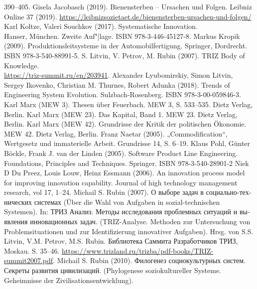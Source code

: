 \documentclass[11pt,a4paper]{article}
\begin{document}
\begin{thebibliography}{xxx}
  390–405.
 Gisela Jacobasch (2019). Bienensterben -- Ursachen und
  Folgen.  Leibniz Online 37 (2019).
  \url{https://leibnizsozietaet.de/bienensterben-ursachen-und-folgen/}
 Karl Koltze, Valeri Souchkov (2017).  Systematische
  Innovation.\\ Hanser, München. Zweite Auf"|lage. ISBN 978-3-446-45127-8.
 Markus Kropik (2009). Produktionsleitsysteme in der
    Automobilfertigung. Springer, Dordrecht.\\ ISBN 978-3-540-88991-5.
 S. Litvin, V. Petrov, M. Rubin (2007). TRIZ Body of
  Knowledge. \\ \url{https://triz-summit.ru/en/203941}.
 Alexander Lyubomirskiy, Simon Litvin, Sergey Ikovenko,
  Christian M. Thurnes, Robert Adunka (2018). Trends of Engineering System
  Evolution. Sulzbach-Rosenberg.  ISBN 978-3-00-059846-3.
 Karl Marx (MEW 3).  Thesen über Feuerbach. MEW 3, S. 533--535.
  Dietz Verlag, Berlin.
 Karl Marx (MEW 23). Das Kapital, Band 1. MEW 23. Dietz Verlag,
  Berlin.
 Karl Marx (MEW 42). Grundrisse der Kritik der politischen
  Ökonomie.  MEW 42. Dietz Verlag, Berlin.
 Franz Naetar (2005). „Commodification“, Wertgesetz und
  immaterielle Arbeit. Grundrisse 14, S. 6--19.
 Klaus Pohl, Günter Böckle, Frank J. van der Linden (2005).
  Software Product Line Engineering. Foundations, Principles and Techniques.
  Springer. ISBN 978-3-540-28901-2
 Niek D Du Preez, Louis Louw, Heinz Essmann (2006). An
  innovation process model for improving innovation capability.  Journal of
  high technology management research, vol 17, 1--24.
 Michail S. Rubin (2007). \foreignlanguage{russian}{О
  выборе задач в социально-технических системах} (Über die Wahl von Aufgaben
  in sozial-technischen Systemen). In: \foreignlanguage{russian}{ТРИЗ Анализ.
    Методы исследования проблемных ситуаций и выявления инновационных задач}.
  (TRIZ-Analyse. Methoden zur Untersuchung von Problemsituationen und zur
  Identifizierung innovativer Aufgaben). Hrsg. von S.S. Litvin, V.M. Petrov,
  M.S. Rubin. \foreignlanguage{russian}{Библиотека Саммита Разработчиков
    ТРИЗ}, Moskau. S. 35--46.
  \url{https://www.trizland.ru/trizba/pdf-books/TRIZ-summit2007.pdf}.
 Michail S. Rubin (2010).
  \foreignlanguage{russian}{Филогенез социокультурных систем. Секреты развития
    цивилизаций}.  (Phylogenese soziokultureller Systeme. Geheimnisse der
  Zivilisationsentwicklung).

\end{thebibliography}
\end{document}

